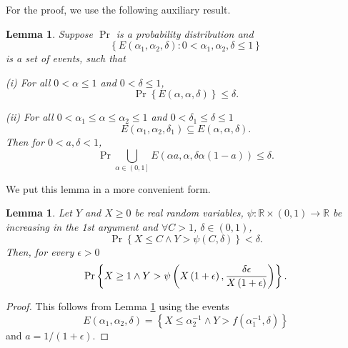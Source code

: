 \documentclass{article} %
\newtheorem{lemma}[theorem]{Lemma}
\begin{document}
For the proof, we use the following auxiliary result.

\begin{lemma}
	\label{Lemma model selection} \cite[][Lemma 15.6]{Anthony99} Suppose $\Pr $
	is a probability distribution and%
	\begin{equation*}
		\left\{ E\left( \alpha _{1},\alpha _{2},\delta \right) :0<\alpha _{1},\alpha
		_{2},\delta \leq 1\right\}
	\end{equation*}%
	is a set of events, such that
	
	(i) For all $0<\alpha \leq 1$ and $0<\delta \leq 1$,%
	\begin{equation*}
		\Pr \left\{ E\left( \alpha ,\alpha ,\delta \right) \right\} \leq \delta .
	\end{equation*}
	
	(ii) For all $0<\alpha _{1}\leq \alpha \leq \alpha _{2}\leq 1$ and $0<\delta
	_{1}\leq \delta \leq 1$%
	\begin{equation*}
		E\left( \alpha _{1},\alpha _{2},\delta _{1}\right) \subseteq E\left( \alpha
		,\alpha ,\delta \right) .
	\end{equation*}%
	Then for $0<a,\delta <1$,%
	\begin{equation*}
		\Pr \bigcup_{\alpha \in \left( 0,1\right] }E\left( \alpha a,\alpha ,\delta
		\alpha \left( 1-a\right) \right) \leq \delta .
	\end{equation*}
\end{lemma}

We put this lemma in a more convenient form.

\begin{lemma}
	\label{Lemma IvanovTychonov}Let $Y$ and $X\geq 0$ be real random variables, $%
	\psi :\mathbb{R}\times \left( 0,1\right) \rightarrow \mathbb{R}$ be
	increasing in the 1st argument and $\forall C>1$, $\delta \in \left(
	0,1\right) $, 
	\begin{equation*}
		\Pr \left\{ X\leq C\wedge Y>\psi \left( C,\delta \right) \right\} <\delta .
	\end{equation*}%
	Then, for every $\epsilon >0$%
	\begin{equation*}
		\Pr \left\{ X\geq 1\wedge Y>\psi \left( X\left( 1+\epsilon \right) ,\frac{%
			\delta \epsilon }{X\left( 1+\epsilon \right) }\right) \right\} .
	\end{equation*}
\end{lemma}

\begin{proof}
	This follows from Lemma \ref{Lemma model selection} using the events 
	\begin{equation*}
		E\left( \alpha _{1},\alpha _{2},\delta \right) =\left\{ X\leq \alpha
		_{2}^{-1}\wedge Y>f\left( \alpha _{1}^{-1},\delta \right) \right\} 
	\end{equation*}%
	and $a=1/\left( 1+\epsilon \right) $.
\end{proof}
\end{document}

